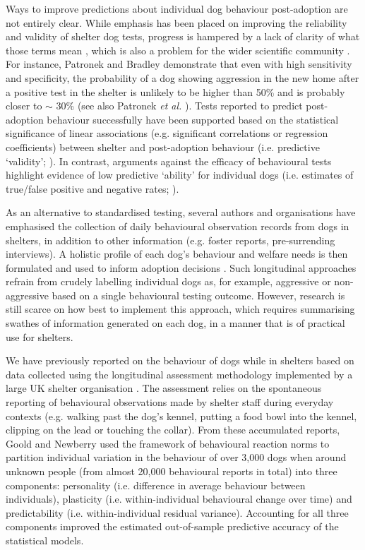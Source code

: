 \documentclass[fleqn,10pt]{wlscirep}
\begin{document}
Ways to improve predictions about individual dog behaviour post-adoption are not entirely clear. While emphasis has been placed on improving the reliability and validity of shelter dog tests, progress is hampered by a lack of clarity of what those terms mean \cite{patronek2019,rayment2015}, which is also a problem for the wider scientific community \cite{borsboom2004,borsboom2009,maul2016}. For instance, Patronek and Bradley \cite{patbrad2016} demonstrate that even with high sensitivity and specificity, the probability of a dog showing aggression in the new home after a positive test in the shelter is unlikely to be higher than 50\% and is probably closer to $\sim$ 30\% (see also Patronek \textit{et al.} \cite{patronek2019}). Tests reported to predict post-adoption behaviour successfully \cite{valsecchi2011,poulsen2010,bollen2008} have been supported based on the statistical significance of linear associations (e.g. significant correlations or regression coefficients) between shelter and post-adoption behaviour (i.e. predictive `validity'; \cite{patronek2019}). In contrast, arguments against the efficacy of behavioural tests highlight evidence of low predictive `ability' for individual dogs (i.e. estimates of true/false positive and negative rates; \cite{patronek2019}).

As an alternative to standardised testing, several authors and organisations have emphasised the collection of daily behavioural observation records from dogs in shelters, in addition to other information (e.g. foster reports, pre-surrending interviews). A holistic profile of each dog's behaviour and welfare needs is then formulated and used to inform adoption decisions \cite{patronek2019,ASPCA2018,rayment2015,mornement2015,clay2020}. Such longitudinal approaches refrain from crudely labelling individual dogs as, for example, aggressive or non-aggressive based on a single behavioural testing outcome. However, research is still scarce on how best to implement this approach, which requires summarising swathes of information generated on each dog, in a manner that is of practical use for shelters.

We have previously reported on the behaviour of dogs while in shelters based on data collected using the longitudinal assessment methodology implemented by a large UK shelter organisation \cite{goold2017aggressiveness,goold2017modelling}. The assessment relies on the spontaneous reporting of behavioural observations made by shelter staff during everyday contexts (e.g. walking past the dog's kennel, putting a food bowl into the kennel, clipping on the lead or touching the collar). From these accumulated reports, Goold and Newberry \cite{goold2017modelling} used the framework of behavioural reaction norms \cite{dingemanse2010,cleasby2015} to partition individual variation in the behaviour of over 3,000 dogs when around unknown people (from almost 20,000 behavioural reports in total) into three components: personality (i.e. difference in average behaviour between individuals), plasticity (i.e. within-individual behavioural change over time) and predictability (i.e. within-individual residual variance). Accounting for all three components improved the estimated out-of-sample predictive accuracy of the statistical models.
\end{document}
